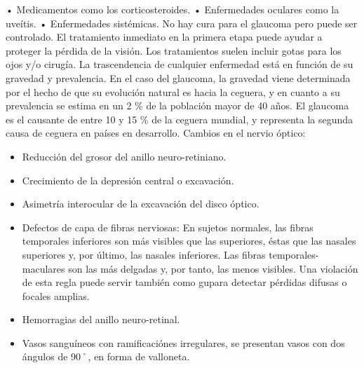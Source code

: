 \begin{itemize}
•	Medicamentos como los corticosteroides.
•	Enfermedades oculares como la uve\'itis.
•	Enfermedades sist\'emicas.
No hay cura para el glaucoma pero puede ser controlado. El tratamiento inmediato en la primera etapa puede ayudar a proteger la p\'erdida de la visi\'on. Los tratamientos suelen incluir gotas para los ojos y/o cirug\'ia. La trascendencia de cualquier enfermedad est\'a en funci\'on de su gravedad y prevalencia. En el caso del glaucoma, la gravedad viene determinada por el hecho de que su evoluci\'on natural es hacia la ceguera, y en cuanto a su prevalencia se estima en un 2 \% de la poblaci\'on mayor de 40 años. El glaucoma es el causante de entre 10 y 15 \% de la ceguera mundial, y representa la segunda causa de ceguera en pa\'ises en desarrollo.
Cambios en el nervio \'optico:
\begin{itemize}
	\item Reducci\'on del grosor del anillo neuro-retiniano.
	\item Crecimiento de la depresi\'on central o excavaci\'on.
	\item Asimetr\'ia interocular de la excavaci\'on del disco \'optico.
	\item Defectos de capa de fibras nerviosas: En sujetos normales, las fibras temporales inferiores son m\'as visibles que las superiores, \'estas que las nasales superiores y, por \'ultimo, las nasales inferiores. Las fibras temporales-maculares son las m\'as delgadas y, por tanto, las menos visibles. Una violaci\'on de esta regla puede servir tambi\'en como gu\ia para detectar p\'erdidas difusas o focales amplias.
	\item Hemorragias del anillo neuro-retinal.
	\item Vasos sangu\'ineos con ramificaci\'ones irregulares, se presentan vasos con dos ángulos de 90˚, en forma de valloneta.
\end{itemize}
\end{itemize}
 
